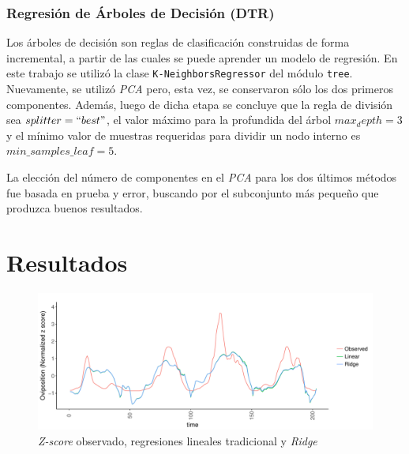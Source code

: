     \subsubsection{Regresión de Árboles de Decisión (DTR)}
      \par Los árboles de decisión son reglas de clasificación construidas de
      forma incremental, a partir de las cuales se puede aprender un modelo
      de regresión. En este trabajo se utilizó la clase \verb|K-NeighborsRegressor|
      del módulo \verb|tree|. Nuevamente, se utilizó \textit{PCA} pero, esta
      vez, se conservaron sólo los dos primeros componentes. Además, luego de
      dicha etapa se concluye que la regla de división sea $splitter = ``best"$,
      el valor máximo para la profundida del árbol $max_depth = 3$ y el mínimo
      valor de muestras requeridas para dividir un nodo interno es
      $min\_samples\_leaf = 5$.

      \par La elección del número de componentes en el \textit{PCA} para los
      dos últimos métodos fue basada en prueba y error, buscando por el
      subconjunto más pequeño que produzca buenos resultados.


  \section{Resultados}
    \begin{figure}[hbt]
    \centering%
    \includegraphics[width=1\textwidth]{images/RidgeVsTime}%
    \caption{\textit{Z-score} observado, regresiones lineales tradicional y
             \textit{Ridge}}\label{fig:ridge_vs_time}
    \end{figure}


